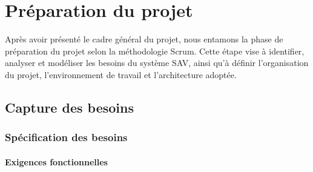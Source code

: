 \newpage
\pagestyle{fancy}
\renewcommand{\headrulewidth}{0.5pt}
\renewcommand{\footrulewidth}{0.5pt}
\chapter{Préparation du projet}\setlength{\headheight}{28pt}
\label{ch2}
\thispagestyle{empty}
\minitoc
\newpage

Après avoir présenté le cadre général du projet, nous entamons la phase de préparation du projet
selon la méthodologie Scrum. Cette étape vise à identifier, analyser et modéliser les besoins du
système SAV, ainsi qu'à définir l'organisation du projet, l'environnement de travail et l'architecture
adoptée.

\section{Capture des besoins}

\subsection{Spécification des besoins}

\subsubsection{Exigences fonctionnelles}

